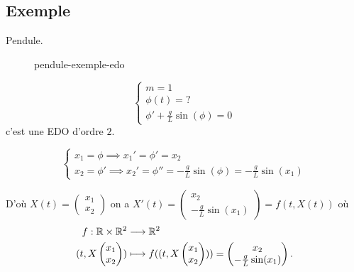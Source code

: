 \subsection{Exemple}
\begin{eg}
   Pendule. 
\begin{figure}[H]
    \centering
    \caption{pendule-exemple-edo}
    \label{fig:pendule-exemple-edo}
\end{figure}
\[
\begin{cases}
    m = 1\\
    \phi(t) = ?\\
    \phi' + \frac{g}{L}\sin(\phi) = 0
\end{cases}
\] 
c'est une EDO d'ordre $2$.

 \[
\begin{cases}
    x_1 = \phi \implies x_1' = \phi' = x_2\\
    x_2 = \phi' \implies x_2' = \phi'' = -\frac{g}{L}\sin(\phi) = -\frac{g}{L}\sin(x_1)
\end{cases}
\] 

D'où $X(t) = \begin{pmatrix} x_1 \\ x_2 \end{pmatrix} $ on a $X'(t) = \begin{pmatrix} x_2 \\ -\frac{g}{L}\sin(x_1) \end{pmatrix} = f(t, X(t)) $ 
où \begin{align*}
    f: \mathbb{R} \times \mathbb{R}^2 &\longrightarrow \mathbb{R}^2 \\
    (t, X\begin{pmatrix} x_1\\x_2 \end{pmatrix} ) &\longmapsto f((t, X\begin{pmatrix} x_1\\x_2 \end{pmatrix} )) = \begin{pmatrix} x_2 \\ -\frac{g}{L}\sin(x_1) \end{pmatrix} 
.\end{align*}

\end{eg}
